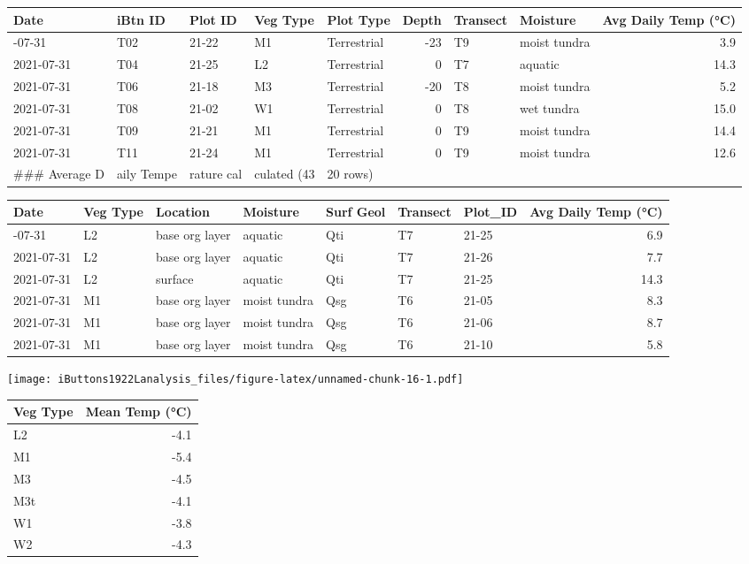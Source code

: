 \documentclass[
]{article}
\begin{document}
\begin{longtable}[]{@{}lllllrllr@{}}
\toprule\noalign{}
Date & iBtn ID & Plot ID & Veg Type & Plot Type & Depth & Transect &
Moisture & Avg Daily Temp (°C) \\
\midrule\noalign{}
\endhead
\bottomrule\noalign{}
\endlastfoot
2021-07-31 & T02 & 21-22 & M1 & Terrestrial & -23 & T9 & moist tundra &
3.9 \\
2021-07-31 & T04 & 21-25 & L2 & Terrestrial & 0 & T7 & aquatic & 14.3 \\
2021-07-31 & T06 & 21-18 & M3 & Terrestrial & -20 & T8 & moist tundra &
5.2 \\
2021-07-31 & T08 & 21-02 & W1 & Terrestrial & 0 & T8 & wet tundra &
15.0 \\
2021-07-31 & T09 & 21-21 & M1 & Terrestrial & 0 & T9 & moist tundra &
14.4 \\
2021-07-31 & T11 & 21-24 & M1 & Terrestrial & 0 & T9 & moist tundra &
12.6 \\
\#\#\# Average D & aily Tempe & rature cal & culated (43 & 20 rows) & &
& & \\
\end{longtable}

\begin{longtable}[]{@{}lllllllr@{}}
\toprule\noalign{}
Date & Veg Type & Location & Moisture & Surf Geol & Transect & Plot\_ID
& Avg Daily Temp (°C) \\
\midrule\noalign{}
\endhead
\bottomrule\noalign{}
\endlastfoot
2021-07-31 & L2 & base org layer & aquatic & Qti & T7 & 21-25 & 6.9 \\
2021-07-31 & L2 & base org layer & aquatic & Qti & T7 & 21-26 & 7.7 \\
2021-07-31 & L2 & surface & aquatic & Qti & T7 & 21-25 & 14.3 \\
2021-07-31 & M1 & base org layer & moist tundra & Qsg & T6 & 21-05 &
8.3 \\
2021-07-31 & M1 & base org layer & moist tundra & Qsg & T6 & 21-06 &
8.7 \\
2021-07-31 & M1 & base org layer & moist tundra & Qsg & T6 & 21-10 &
5.8 \\
\end{longtable}

\texttt{[image: iButtons1922Lanalysis\_files/figure-latex/unnamed-chunk-16-1.pdf]}

\begin{longtable}[]{@{}lr@{}}
\toprule\noalign{}
Veg Type & Mean Temp (°C) \\
\midrule\noalign{}
\endhead
\bottomrule\noalign{}
\endlastfoot
L2 & -4.1 \\
M1 & -5.4 \\
M3 & -4.5 \\
M3t & -4.1 \\
W1 & -3.8 \\
W2 & -4.3 \\
\end{longtable}
\end{document}
